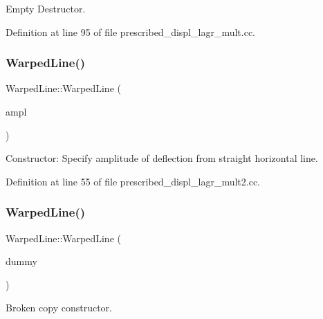 Empty Destructor. 



Definition at line 95 of file prescribed\+\_\+displ\+\_\+lagr\+\_\+mult.\+cc.

\mbox{\label{classWarpedLine_a9d80dca2c907b426f7130579c94f3310}} 
\subsubsection{\texorpdfstring{Warped\+Line()}{WarpedLine()}\hspace{0.1cm}{\footnotesize\ttfamily [3/6]}}
{\footnotesize\ttfamily Warped\+Line\+::\+Warped\+Line (\begin{DoxyParamCaption}\item[{const double \&}]{ampl }\end{DoxyParamCaption})\hspace{0.3cm}{\ttfamily [inline]}}



Constructor\+: Specify amplitude of deflection from straight horizontal line. 



Definition at line 55 of file prescribed\+\_\+displ\+\_\+lagr\+\_\+mult2.\+cc.

\mbox{\label{classWarpedLine_a53a7426303864ea2d34aeba0a3f6324f}} 
\subsubsection{\texorpdfstring{Warped\+Line()}{WarpedLine()}\hspace{0.1cm}{\footnotesize\ttfamily [4/6]}}
{\footnotesize\ttfamily Warped\+Line\+::\+Warped\+Line (\begin{DoxyParamCaption}\item[{const \hyperlink{classWarpedLine}{Warped\+Line} \&}]{dummy }\end{DoxyParamCaption})\hspace{0.3cm}{\ttfamily [inline]}}



Broken copy constructor. 



